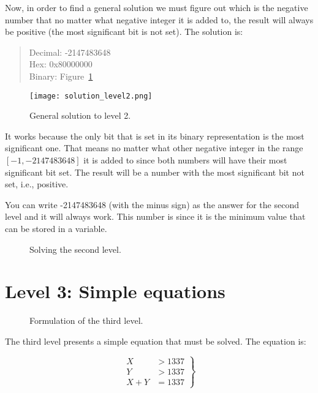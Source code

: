 Now, in order to find a general solution we must figure out which is the negative number that no matter what negative integer it is added to, the result will always be positive (the most significant bit is not set). The solution is:
\begin{quote}
	Decimal: -2147483648\\
	Hex: 0x80000000\\
	Binary: Figure~\ref{fig:solution_level_2}
\end{quote}

\begin{figure}
		\centering
		\texttt{[image: solution\_level2.png]}
		\caption{General solution to level 2.}
		\label{fig:solution_level_2}
\end{figure}

It works because the only bit that is set in its binary representation is the most significant one. That means no matter what other negative integer in the range $[-1, -2147483648]$ it is added to since both numbers will have their most significant bit set. The result will be a number with the most significant bit not set, i.e., positive.  

You can write -2147483648 (with the minus sign) as the answer for the second level and it will always work. This number is  since it is the minimum value that can be stored in a  variable. 
\begin{figure}
	\caption{Solving the second level.}
	\label{fig:solved_level2}
\end{figure}
\clearpage
\section{Level 3: Simple equations}

\begin{figure}[!htpb]
	\caption{Formulation of the third level.}
	\label{fig:intro_level3}
\end{figure}

The third level presents a simple equation that must be solved. The equation is:

\begin{equation*}
	\left.\begin{aligned}
			X &> 1337\\
			Y &> 1337\\
			X + Y &= 1337	
	\end{aligned}
	\right\}
\end{equation*}

